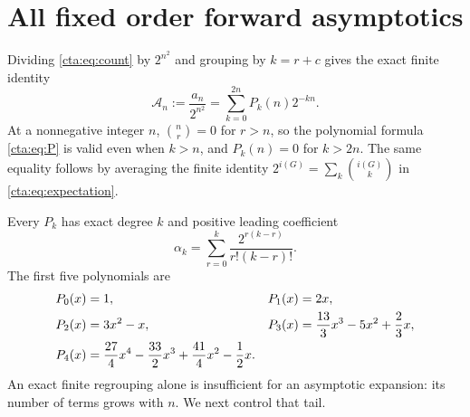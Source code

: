 \documentclass[11pt]{article}
\theoremstyle{definition}
\theoremstyle{remark}
\newcommand{\As}{\mathcal A}
\begin{document}
\section{All fixed order forward asymptotics}\label{cta:sec:forward}

Dividing \eqref{cta:eq:count} by $2^{n^2}$ and grouping by $k=r+c$ gives the
exact finite identity
\begin{equation}\label{cta:eq:sectors}
 \As_n:=\frac{a_n}{2^{n^2}}
    =\sum_{k=0}^{2n}P_k(n)2^{-kn}.
\end{equation}
At a nonnegative integer $n$, $\binom nr=0$ for $r>n$, so the polynomial
formula \eqref{cta:eq:P} is valid even when $k>n$, and $P_k(n)=0$ for $k>2n$.
The same equality follows by averaging the finite identity
$2^{i(G)}=\sum_k\binom{i(G)}k$ in \eqref{cta:eq:expectation}.

Every $P_k$ has exact degree $k$ and positive leading coefficient
\begin{equation}\label{cta:eq:alpha}
 \alpha_k=\sum_{r=0}^k\frac{2^{r(k-r)}}{r!(k-r)!}.
\end{equation}
The first five polynomials are
\begin{align}\label{cta:eq:firstP}
 P_0(x)&=1,&P_1(x)&=2x,\notag\\
 P_2(x)&=3x^2-x,&
 P_3(x)&=\frac{13}{3}x^3-5x^2+\frac23x,\notag\\
 P_4(x)&=\frac{27}{4}x^4-\frac{33}{2}x^3+\frac{41}{4}x^2-\frac12x.
\end{align}
An exact finite regrouping alone is insufficient for an asymptotic
expansion: its number of terms grows with $n$. We next control that tail.
\end{document}
